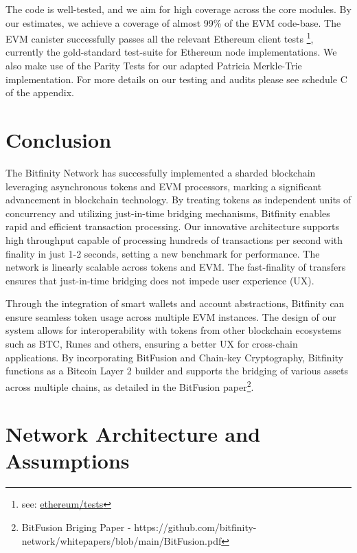 \documentclass{article}
\begin{document}
The code is well-tested, and we aim for high coverage across the core modules. By our estimates, we achieve a coverage of almost 99\% of the EVM code-base. The EVM canister successfully passes all the relevant Ethereum client tests \footnote{see: \href{https://github.com/ethereum/tests}{ethereum/tests}}, currently the gold-standard test-suite for Ethereum node implementations. We also make use of the Parity Tests for our adapted Patricia Merkle-Trie implementation. For more details on our testing and audits please see schedule C of the appendix. 

\section{Conclusion}

The Bitfinity Network has successfully implemented a sharded blockchain leveraging asynchronous tokens and EVM processors, marking a significant advancement in blockchain technology. By treating tokens as independent units of concurrency and utilizing just-in-time bridging mechanisms, Bitfinity enables rapid and efficient transaction processing. Our innovative architecture supports high throughput capable of processing hundreds of transactions per second with finality in just 1-2 seconds, setting a new benchmark for performance. The network is linearly scalable across tokens and EVM. The fast-finality of transfers ensures that just-in-time bridging does not impede user experience (UX).

Through the integration of smart wallets and account abstractions, Bitfinity can ensure seamless token usage across multiple EVM instances. The design of our system allows for interoperability with tokens from other blockchain ecosystems such as BTC, Runes and others, ensuring a better UX for cross-chain applications. By incorporating BitFusion and Chain-key Cryptography, Bitfinity functions as a Bitcoin Layer 2 builder and supports the bridging of various assets across multiple chains, as detailed in the BitFusion paper\footnote{BitFusion Briging Paper - https://github.com/bitfinity-network/whitepapers/blob/main/BitFusion.pdf}.

\nocite*{}



\appendix

\clearpage

\section{Network Architecture and Assumptions}
\end{document}
